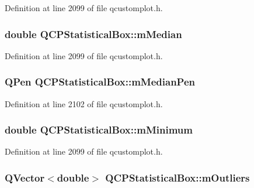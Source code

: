 Definition at line 2099 of file qcustomplot.\-h.

\hypertarget{class_q_c_p_statistical_box_ae43287ca13c8166bde2ac19bf0969d23}{
\subsubsection[{m\-Median}]{\setlength{\rightskip}{0pt plus 5cm}double Q\-C\-P\-Statistical\-Box\-::m\-Median\hspace{0.3cm}{\ttfamily [protected]}}}\label{class_q_c_p_statistical_box_ae43287ca13c8166bde2ac19bf0969d23}


Definition at line 2099 of file qcustomplot.\-h.

\hypertarget{class_q_c_p_statistical_box_a1af5b601049c575f778ae270f40c9443}{
\subsubsection[{m\-Median\-Pen}]{\setlength{\rightskip}{0pt plus 5cm}Q\-Pen Q\-C\-P\-Statistical\-Box\-::m\-Median\-Pen\hspace{0.3cm}{\ttfamily [protected]}}}\label{class_q_c_p_statistical_box_a1af5b601049c575f778ae270f40c9443}


Definition at line 2102 of file qcustomplot.\-h.

\hypertarget{class_q_c_p_statistical_box_a7143ece4e7e5f9ac010739fbc390bf0c}{
\subsubsection[{m\-Minimum}]{\setlength{\rightskip}{0pt plus 5cm}double Q\-C\-P\-Statistical\-Box\-::m\-Minimum\hspace{0.3cm}{\ttfamily [protected]}}}\label{class_q_c_p_statistical_box_a7143ece4e7e5f9ac010739fbc390bf0c}


Definition at line 2099 of file qcustomplot.\-h.

\hypertarget{class_q_c_p_statistical_box_a415e2f77a89396c2af999afe027bdf6c}{
\subsubsection[{m\-Outliers}]{\setlength{\rightskip}{0pt plus 5cm}Q\-Vector$<$double$>$ Q\-C\-P\-Statistical\-Box\-::m\-Outliers\hspace{0.3cm}{\ttfamily [protected]}}}\label{class_q_c_p_statistical_box_a415e2f77a89396c2af999afe027bdf6c}


